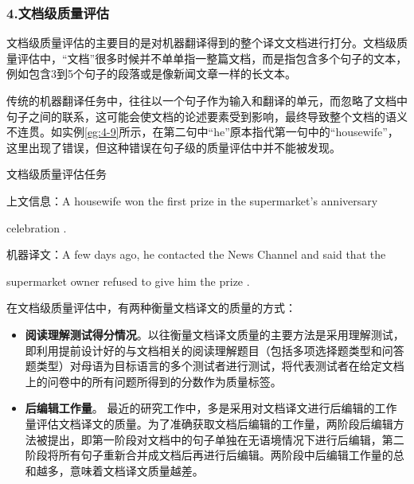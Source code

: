 
\subsubsection{4.文档级质量评估}

\parinterval 文档级质量评估的主要目的是对机器翻译得到的整个译文文档进行打分。文档级质量评估中，“文档”很多时候并不单单指一整篇文档，而是指包含多个句子的文本，例如包含3到5个句子的段落或是像新闻文章一样的长文本。

\parinterval 传统的机器翻译任务中，往往以一个句子作为输入和翻译的单元，而忽略了文档中句子之间的联系，这可能会使文档的论述要素受到影响，最终导致整个文档的语义不连贯。如实例\ref{eg:4-9}所示，在第二句中“he”原本指代第一句中的“housewife”，这里出现了错误，但这种错误在句子级的质量评估中并不能被发现。

\begin{example}
文档级质量评估任务

上文信息：A {\red housewife} won the first prize in the supermarket's anniversary

\hspace{5em}celebration .

机器译文：A few days ago, {\red he} contacted the News Channel and said that the

\hspace{5em}supermarket owner refused to give {\red him} the prize .
\label{eg:4-9}
\end{example}

\parinterval 在文档级质量评估中，有两种衡量文档译文的质量的方式：

\begin{itemize}
\vspace{0.5em}
\item {\small\sffamily\bfseries{阅读理解测试得分情况}}。以往衡量文档译文质量的主要方法是采用理解测试，即利用提前设计好的与文档相关的阅读理解题目（包括多项选择题类型和问答题类型）对母语为目标语言的多个测试者进行测试，将代表测试者在给定文档上的问卷中的所有问题所得到的分数作为质量标签。
\vspace{0.5em}
\item {\small\sffamily\bfseries{后编辑工作量}}。 最近的研究工作中，多是采用对文档译文进行后编辑的工作量评估文档译文的质量。为了准确获取文档后编辑的工作量，两阶段后编辑方法被提出，即第一阶段对文档中的句子单独在无语境情况下进行后编辑，第二阶段将所有句子重新合并成文档后再进行后编辑。两阶段中后编辑工作量的总和越多，意味着文档译文质量越差。
\vspace{0.5em}
\end{itemize}

